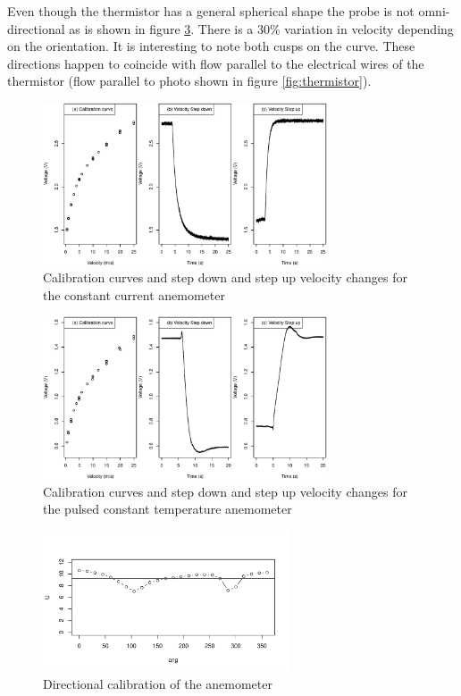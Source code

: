 \documentclass[10pt,fleqn,a4paper,twoside]{article}
\begin{document}
Even though the thermistor has a general spherical shape the probe is not omni-directional as is shown in figure \ref{fig:calibr-dir}. There is a 30\% variation in velocity depending on the orientation. It is interesting to note both cusps on the curve. These directions happen to coincide with flow parallel to the electrical wires of the thermistor (flow parallel to photo shown in figure \ref{fig:thermistor}). 
\begin{figure}[h!]
\centering
\includegraphics[width=0.75\textwidth]{../../figures/cca-cal.pdf}
\caption{Calibration curves and step down and step up velocity changes for the constant current anemometer}
\label{fig:calibr-cca}
\end{figure}


\begin{figure}[h!]
\centering
\includegraphics[width=0.75\textwidth]{../../figures/cta-cal.pdf}
\caption{Calibration curves and step down and step up velocity changes for the pulsed constant temperature anemometer}
\label{fig:calibr-cta}
\end{figure}

\begin{figure}[h!]
\centering
\includegraphics[width=0.65\textwidth]{../../figures/dircal.pdf}
\caption{Directional calibration of the anemometer}
\label{fig:calibr-dir}
\end{figure}
\end{document}
